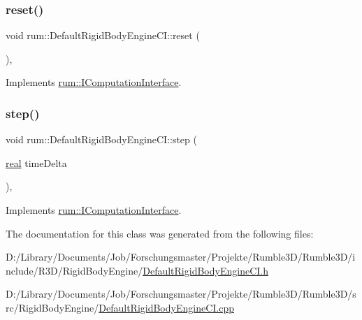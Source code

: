 \subsubsection{\texorpdfstring{reset()}{reset()}}
{\footnotesize\ttfamily void rum\+::\+Default\+Rigid\+Body\+Engine\+C\+I\+::reset (\begin{DoxyParamCaption}{ }\end{DoxyParamCaption})\hspace{0.3cm}{\ttfamily [override]}, {\ttfamily [virtual]}}



Implements \mbox{\hyperlink{classrum_1_1_i_computation_interface_a9cff2ff492abd2a4f014aa4f25184c8b}{rum\+::\+I\+Computation\+Interface}}.

\mbox{\label{classrum_1_1_default_rigid_body_engine_c_i_ae8b25ed02fc8fecc4d606d5c5dad6b4e}} 
\subsubsection{\texorpdfstring{step()}{step()}}
{\footnotesize\ttfamily void rum\+::\+Default\+Rigid\+Body\+Engine\+C\+I\+::step (\begin{DoxyParamCaption}\item[{\mbox{\hyperlink{namespacerum_a7e8cca23573d5eaead0f138cbaa4862c}{real}}}]{time\+Delta }\end{DoxyParamCaption})\hspace{0.3cm}{\ttfamily [override]}, {\ttfamily [virtual]}}



Implements \mbox{\hyperlink{classrum_1_1_i_computation_interface_aa033d368ac4057a52077d6724b94d334}{rum\+::\+I\+Computation\+Interface}}.



The documentation for this class was generated from the following files\+:\begin{DoxyCompactItemize}
\item 
D\+:/\+Library/\+Documents/\+Job/\+Forschungsmaster/\+Projekte/\+Rumble3\+D/\+Rumble3\+D/include/\+R3\+D/\+Rigid\+Body\+Engine/\mbox{\hyperlink{_default_rigid_body_engine_c_i_8h}{Default\+Rigid\+Body\+Engine\+C\+I.\+h}}\item 
D\+:/\+Library/\+Documents/\+Job/\+Forschungsmaster/\+Projekte/\+Rumble3\+D/\+Rumble3\+D/src/\+Rigid\+Body\+Engine/\mbox{\hyperlink{_default_rigid_body_engine_c_i_8cpp}{Default\+Rigid\+Body\+Engine\+C\+I.\+cpp}}\end{DoxyCompactItemize}
